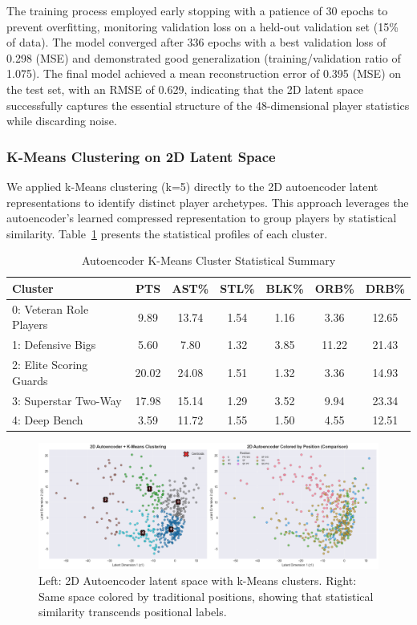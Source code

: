 \documentclass{article}
\begin{document}
The training process employed early stopping with a patience of 30 epochs to prevent overfitting, monitoring validation loss on a held-out validation set (15\% of data). The model converged after 336 epochs with a best validation loss of 0.298 (MSE) and demonstrated good generalization (training/validation ratio of 1.075). The final model achieved a mean reconstruction error of 0.395 (MSE) on the test set, with an RMSE of 0.629, indicating that the 2D latent space successfully captures the essential structure of the 48-dimensional player statistics while discarding noise.

\subsubsection{K-Means Clustering on 2D Latent Space}

We applied k-Means clustering (k=5) directly to the 2D autoencoder latent representations to identify distinct player archetypes. This approach leverages the autoencoder's learned compressed representation to group players by statistical similarity. Table~\ref{tab:ae_cluster_stats} presents the statistical profiles of each cluster.

\begin{table}[h!]
\centering
\caption{Autoencoder K-Means Cluster Statistical Summary}
\label{tab:ae_cluster_stats}
\begin{tabular}{lcccccc}
\toprule
\textbf{Cluster} & \textbf{PTS} & \textbf{AST\%} & \textbf{STL\%} & \textbf{BLK\%} & \textbf{ORB\%} & \textbf{DRB\%} \\
\midrule
0: Veteran Role Players & 9.89 & 13.74 & 1.54 & 1.16 & 3.36 & 12.65 \\
1: Defensive Bigs & 5.60 & 7.80 & 1.32 & 3.85 & 11.22 & 21.43 \\
2: Elite Scoring Guards & 20.02 & 24.08 & 1.51 & 1.32 & 3.36 & 14.93 \\
3: Superstar Two-Way & 17.98 & 15.14 & 1.29 & 3.52 & 9.94 & 23.34 \\
4: Deep Bench & 3.59 & 11.72 & 1.55 & 1.50 & 4.55 & 12.51 \\
\bottomrule
\end{tabular}
\end{table}

\begin{figure}[h]
    \centering
    \includegraphics[width=\linewidth]{media/2a.png}
    \caption{Left: 2D Autoencoder latent space with k-Means clusters. Right: Same space colored by traditional positions, showing that statistical similarity transcends positional labels.}
    \label{fig:ae_clustering}
\end{figure}
\end{document}
